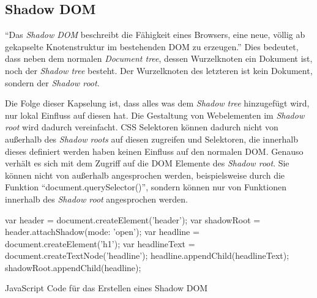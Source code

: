 \documentclass[12pt, paper=a4, bibtotoc, toc=listof, headsepline=true]{scrreprt}
\begin{document}
		\subsection{Shadow DOM}
		\enquote{Das \emph{Shadow \ac{DOM}} beschreibt die Fähigkeit eines Browsers, eine neue, völlig ab gekapselte Knotenstruktur im bestehenden \ac{DOM} zu erzeugen.}\cite[Kap. 11.1.4]{gasston2014moderne} Dies bedeutet, dass neben dem normalen \emph{Document tree}, dessen Wurzelknoten ein Dokument ist, noch der \emph{Shadow tree} besteht. Der Wurzelknoten des letzteren ist kein Dokument, sondern der \emph{Shadow root}.

		Die Folge dieser Kapselung ist, dass alles was dem \emph{Shadow tree} hinzugefügt wird, nur lokal Einfluss auf diesen hat. Die Gestaltung von Webelementen im \emph{Shadow root} wird dadurch vereinfacht.
		\ac{CSS} Selektoren können dadurch nicht von außerhalb des \emph{Shadow roots} auf diesen zugreifen und Selektoren, die innerhalb dieses definiert werden haben keinen Einfluss auf den normalen \ac{DOM}. Genauso verhält es sich mit dem Zugriff auf die \ac{DOM} Elemente des \emph{Shadow root}. Sie können nicht von außerhalb angesprochen werden, beispielsweise durch die Funktion \enquote{document.querySelector()}, sondern können nur von Funktionen innerhalb des \emph{Shadow root} angesprochen werden.\cite[vgl.]{Bidelman2016}
		\begin{listing}
			\begin{JavaScriptcode*}{}
var header = document.createElement('header');
var shadowRoot = header.attachShadow({mode: 'open'});
var headline = document.createElement('h1');
var headlineText = document.createTextNode('headline');
headline.appendChild(headlineText);
shadowRoot.appendChild(headline);
			\end{JavaScriptcode*}
				\caption{JavaScript Code für das Erstellen eines Shadow DOM}
				\label{lst:javShaDom}
		\end{listing}
\end{document}
